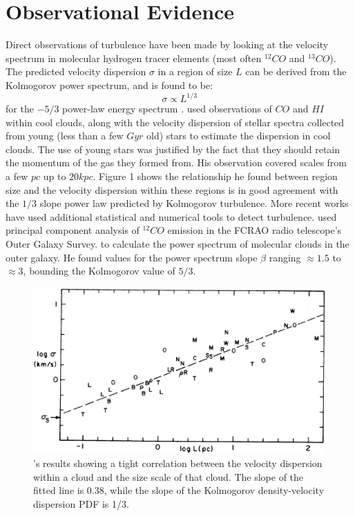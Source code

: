 \documentclass[12pt, preprint]{aastex}
\begin{document}
\section{Observational Evidence}
Direct observations of turbulence have been made by looking at the velocity
spectrum in molecular hydrogen tracer elements (most often $^{12}CO$ and
$^{13}CO$). The predicted velocity dispersion $\sigma$ in a region of size $L$ can be
derived from the Kolmogorov power spectrum, and is found to be:
$$\sigma \propto L^{1/3}$$
for the $-5/3$ power-law energy spectrum \citep{larson1979}.
\citet{larson1979} used observations of $CO$ and $HI$ within cool
clouds, along with the velocity dispersion of stellar spectra collected from
young (less than a few $Gyr$ old) stars to estimate the dispersion in cool clouds.  
The use of young stars was justified by the fact that they should retain the
momentum of the gas they formed from.  His
observation covered scales from a few $pc$ up to $20 kpc$.  Figure 1 shows
the relationship he found between region size and the velocity dispersion
within these regions is in good agreement with the $1/3$ slope power law
predicted by Kolmogorov turbulence.
More recent works have used additional statistical and numerical tools to detect
turbulence.  \citet{brunt2003} used principal component analysis of $^{12}CO$
emission in the FCRAO radio telescope's Outer Galaxy Survey.  to calculate the
power spectrum of molecular clouds in the outer galaxy.  He found values for the
power spectrum slope $\beta$ ranging $\approx 1.5$ to $\approx 3$, bounding the
Kolmogorov value of $5/3$.

\begin{figure}[H]
	\centering
	\includegraphics[scale=0.4]{figures/larsonlaw_larson1981.eps}
	\caption{\citet{larson1981}'s results showing a tight correlation between
	the velocity dispersion within a cloud and the size scale of that cloud.
The slope of the fitted line is 0.38, while the slope of the Kolmogorov
density-velocity dispersion PDF is 1/3.}
\end{figure}
\end{document}
